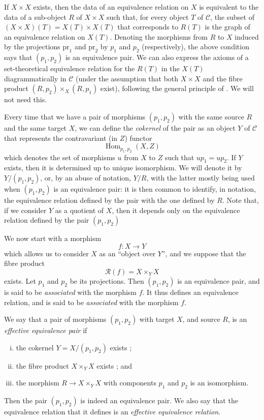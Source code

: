 \documentclass{article}
\renewcommand{\cal}[1]{{\mathcal{#1}}}
\newcommand{\pr}{\mathrm{pr}}
\DeclareMathOperator{\Hom}{Hom}
\newcommand{\oldpage}[1]{\marginpar{\footnotesize$\Big\vert$ \textit{p.~#1}}}
\begin{document}
If $X\times X$ exists, then the data of an equivalence relation on $X$ is equivalent to the data of a sub-object $R$ of $X\times X$ such that, for every object $T$ of $\cal{C}$, the subset of $(X\times X)(T)=X(T)\times X(T)$ that corresponds to $R(T)$ is the graph of an equivalence relation on $X(T)$.
Denoting the morphisms from $R$ to $X$ induced by the projections $\pr_1$ and $\pr_2$ by $p_1$ and $p_2$ (respectively), the above condition says that $(p_1,p_2)$ is an equivalence pair.
We can also express the axioms of a set-theoretical equivalence relation for the $R(T)$ in the $X(T)$ diagrammatically in $\cal{C}$ (under the assumption that both $X\times X$ and the fibre product $(R,p_2)\times_X(R,p_1)$ exist), following the general principle of \cite[A.1]{2}.
We will not need this.

Every time that we have a pair of morphisms $(p_1,p_2)$ with the same source $R$ and the same target $X$, we can define the \emph{cokernel} of the pair as an object $Y$ of $\cal{C}$ that represents the contravariant (in $Z$) functor
\[
  \Hom_{p_1,p_2}(X,Z)
\]
which denotes the set of morphisms $u$ from $X$ to $Z$ such that $up_1=up_2$.
If $Y$ exists, then it is determined up to unique isomorphism.
We will denote it by $Y/(p_1,p_2)$, or, by an abuse of notation, $Y/R$, with the latter mostly being used when
\oldpage{212-03}
$(p_1,p_2)$ is an equivalence pair: it is then common to identify, in notation, the equivalence relation defined by the pair with the one defined by $R$.
Note that, if we consider $Y$ as a quotient of $X$, then it depends only on the equivalence relation defined by the pair $(p_1,p_2)$

We now start with a morphism
\[
  f\colon X\to Y
\]
which allows us to consider $X$ as an ``object over $Y$'', and we suppose that the fibre product
\[
  \cal{R}(f) = X\times_Y X
\]
exists.
Let $p_1$ and $p_2$ be its projections.
Then $(p_1,p_2)$ is an equivalence pair, and is said to be \emph{associated} with the morphism $f$.
It thus defines an equivalence relation, and is said to be \emph{associated} with the morphism $f$.

We say that a pair of morphisms $(p_1,p_2)$ with target $X$, and source $R$, is an \emph{effective equivalence pair} if
\begin{enumerate}[(i)]
  \item the cokernel $Y=X/(p_1,p_2)$ exists ;
  \item the fibre product $X\times_Y X$ exists ; and
  \item the morphism $R\to X\times_Y X$ with components $p_1$ and $p_2$ is an isomorphism.
\end{enumerate}
Then the pair $(p_1,p_2)$ is indeed an equivalence pair.
We also say that the equivalence relation that it defines is an \emph{effective equivalence relation}.
\end{document}
